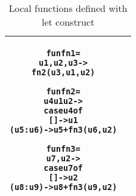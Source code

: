 \documentclass[11pt]{article}
\begin{document}
\begin{table}[h!]
\begin{center}
\begin{tabular}{|c|c|}
\begin{minipage}{3in}
\begin{alltt}
fun fn1 = 
    u1, u2, u3 -> 
       fn2 (u3,u1,u2)

fun fn2 =
  u4 u1 u2 ->
    case u4 of 
      []      -> u1 
      (u5:u6) -> u5 + fn3 (u6,u2)    

fun fn3 =
  u7, u2 ->
    case u7 of 
      []     ->  u2 
      (u8:u9) -> u8 + fn3 (u9,u2)




\end{alltt} 
\end {minipage}
\tabularnewline
\hline
\end{tabular}
\caption{Local functions defined with {\sf let} construct}
\label{LamLiftLet}
\end{center}
\end{table}
\end{document}
